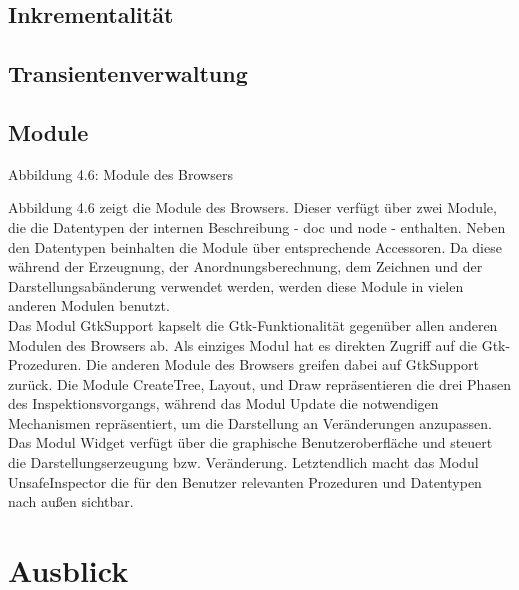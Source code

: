 \documentclass[12pt,a4paper]{article}
\begin{document}
\subsection{Inkrementalit\"at} 

\subsection{Transientenverwaltung}

\subsection{Module}

\begin{center}
\linebreak Abbildung 4.6: Module des Browsers
\end{center}

Abbildung 4.6 zeigt die Module des Browsers.
Dieser verf\"{u}gt \"{u}ber zwei Module, die 
die Datentypen der internen Beschreibung  - doc und node - enthalten. 
Neben den Datentypen beinhalten die Module \"{u}ber 
entsprechende Accessoren.
Da diese w\"{a}hrend der 
Erzeugnung, der Anordnungsberechnung, dem Zeichnen 
und der Darstellungsab\"{a}nderung verwendet werden, 
werden diese Module in vielen anderen Modulen benutzt.\\
Das Modul GtkSupport kapselt die Gtk-Funktionalit\"{a}t 
gegen\"{u}ber allen anderen Modulen des Browsers ab. 
Als einziges Modul hat es direkten Zugriff auf die 
Gtk-Prozeduren. Die anderen Module des Browsers 
greifen dabei auf GtkSupport zur\"{u}ck.
Die Module CreateTree, Layout, und Draw repr\"{a}sentieren 
die drei Phasen des Inspektionsvorgangs, w\"ahrend das Modul 
Update die notwendigen Mechanismen repr\"asentiert, 
um die Darstellung an Ver\"{a}nderungen anzupassen. 
Das Modul Widget verf\"{u}gt \"{u}ber die 
graphische Benutzeroberfl\"{a}che und steuert 
die Darstellungserzeugung bzw. Ver\"{a}nderung. 
Letztendlich macht das Modul UnsafeInspector die f\"{u}r den 
Benutzer relevanten Prozeduren und Datentypen nach au\ss en sichtbar.




\section{Ausblick}
\end{document}
